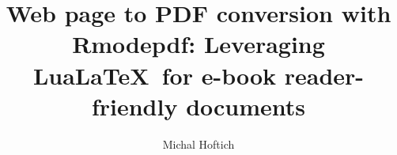\author{Michal Hoftich}
\title{Web page to PDF conversion with Rmodepdf: Leveraging Lua\LaTeX\ for e-book reader-friendly documents}
